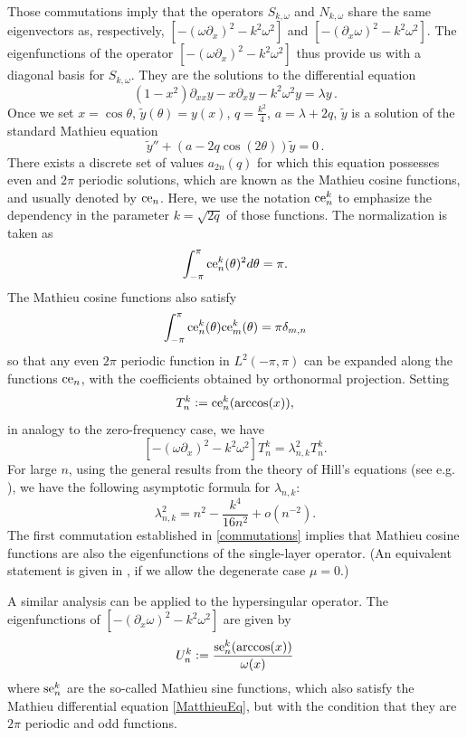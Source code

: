 \documentclass[a4paper]{subfiles}
\begin{document}
Those commutations imply that the operators $S_{k,\omega}$ and $N_{k,\omega}$ share the same eigenvectors as, respectively, 
$\left[-(\omega \partial_x)^2 - k^2\omega^2\right]$ and $ \left[-(\partial_x \omega)^2 - k^2\omega^2\right]$. The eigenfunctions 
of the operator $\left[ -(\omega \partial_x)^2 - k^2\omega^2\right]$ thus provide us with a diagonal basis for $S_{k,\omega}$. 
They are the solutions to the differential equation 
\[ (1-x^2) \partial_{xx}y - x \partial_xy - k^2 \omega^2 y = \lambda y\,.\]
Once we set $x = \cos \theta$, $\tilde{y}(\theta) = y(x)$,  $q = \frac{k^2}{4}$, $a = \lambda + 2q$, $\tilde{y}$ is a solution of the 
standard Mathieu equation 
\begin{equation}
\label{MatthieuEq}
	\tilde{y}'' + (a - 2q \cos(2\theta)) \tilde{y} = 0\,.
\end{equation}
There exists a discrete set of values $a_{2n}(q)$ for which this equation possesses even and $2\pi$ periodic solutions, which are 
known as the Mathieu cosine functions, and usually denoted by $\textup{ce}_n$. Here, we use the notation $\textup{ce}^k_n$ to 
emphasize the dependency in the parameter $k = \sqrt{2q}$ of those functions. The normalization is taken as
\[ \int_{-\pi}^{\pi} \textup{ce}^k_n(\theta)^2 d\theta = \pi.\]
	The Mathieu cosine functions also satisfy
\[ \int_{-\pi}^{\pi}\textup{ce}^k_n(\theta) \textup{ce}^k_m(\theta) = \pi \delta_{m,n}\]
so that any even $2\pi$ periodic function in $L^2(-\pi,\pi)$ can be expanded along the functions $\textup{ce}_n$, with the coefficients 
obtained by orthonormal projection. Setting 
\[T_{n}^k \mathrel{\mathop:}= \textup{ce}^k_n(\arccos(x)),\]
in analogy to the zero-frequency case, we have
\[\left[-(\omega \partial_x)^2 - k^2\omega^2\right] T_{n}^k = \lambda_{n,k}^2 T_{n}^k.\]
For large $n$, using the general results from the theory of Hill's equations (see e.g. \cite[eq. (21), (28) and (29)]{NIST:DLMF}), 
we have the following 
asymptotic formula for $\lambda_{n,k}$:
\[ \lambda_{n,k}^2 = n^2 - \frac{k^4}{16n^2} +o \left(n^{-2}\right). \]
The first commutation established in \autoref{commutations} implies that Mathieu cosine functions are also the eigenfunctions of the 
single-layer operator. (An equivalent statement is given in \cite[Thm 4.2]{betcke2014spectral}, if we allow the degenerate case $\mu = 0$.) 

A similar analysis can be applied to the hypersingular operator. The eigenfunctions of $\left[-(\partial_x \omega)^2 - k^2 \omega^2\right]$ 
are given by 
\[U_n^k \mathrel{\mathop:}= \frac{\textup{se}_n^k(\arccos(x))}{\omega(x)}\]
where $\textup{se}_n^k$ are the so-called Mathieu sine functions, which also satisfy the Mathieu differential equation \eqref{MatthieuEq}, 
but with the condition that they are $2\pi$ periodic and odd functions. 
\end{document}
